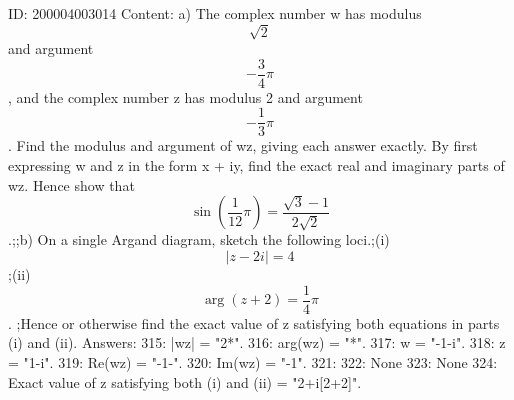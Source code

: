 \documentclass{article}
\begin{document}
ID: 200004003014
Content:
a) The complex number w has modulus  $$\sqrt 2 $$ and argument  $$ - \frac{3}{4}\pi $$, and the complex number z has modulus 2 and argument  $$ - \frac{1}{3}\pi $$. Find the modulus and argument of wz, giving each answer exactly. By first expressing w and z in the form x + iy, find the exact real and imaginary parts of wz. Hence show that  $$\sin (\frac{1}{12}\pi ) =\frac{\sqrt 3  - 1}{2\sqrt 2}$$.;;b) On a single Argand diagram, sketch the following loci.;(i) $$|z - 2i| = 4$$;(ii)  $$\arg ( z + 2 ) = \frac{1}{4}\pi $$. ;Hence or otherwise find the exact value of z satisfying both equations in parts (i) and (ii).  Answers:
315: |wz| = "2*".
316: arg(wz) = "*\pi".
317: w = "-1-i".
318: z = "1-i".
319: Re(wz) = "-1-".
320: Im(wz) = "-1".
321: 
322: None
323: None
324: Exact value of z satisfying both (i) and (ii) = "2+i[2+2]".
\end{document}
